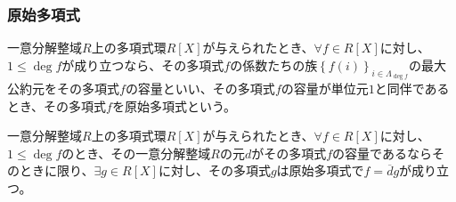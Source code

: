 \documentclass[dvipdfmx]{jsarticle}
\begin{document}
\subsubsection{原始多項式}%
\begin{dfn}
一意分解整域$R$上の多項式環$R[ X]$が与えられたとき、$\forall f \in R[ X]$に対し、$1 \leq \deg f$が成り立つなら、その多項式$f$の係数たちの族$\left\{ f(i) \right\}_{i \in \varLambda_{\deg f}}$の最大公約元をその多項式$f$の容量といい、その多項式$f$の容量が単位元$1$と同伴であるとき、その多項式$f$を原始多項式という。
\end{dfn}
\begin{thm}\label{3.3.5.8}
一意分解整域$R$上の多項式環$R[ X]$が与えられたとき、$\forall f \in R[ X]$に対し、$1 \leq \deg f$のとき、その一意分解整域$R$の元$d$がその多項式$f$の容量であるならそのときに限り、$\exists g \in R[ X]$に対し、その多項式$g$は原始多項式で$f = \overline{d}g$が成り立つ。
\end{thm}
\end{document}
